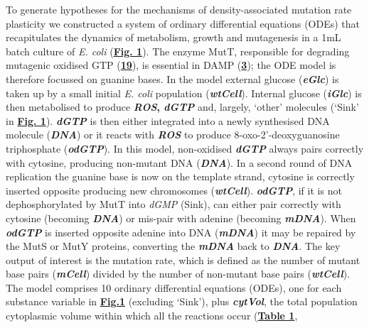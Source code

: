 \documentclass[
  12pt,
  letterpaper,
  DIV=11,
  numbers=noendperiod]{scrreprt}
\begin{document}
To generate hypotheses for the mechanisms of density-associated mutation
rate plasticity we constructed a system of ordinary differential
equations (ODEs) that recapitulates the dynamics of metabolism, growth
and mutagenesis in a 1mL batch culture of \emph{E. coli}
(\href{https://www.biorxiv.org/content/10.1101/2023.09.27.557722v1.full\#F1}{\textbf{Fig.
1}}). The enzyme MutT, responsible for degrading mutagenic oxidised GTP
(\href{https://www.biorxiv.org/content/10.1101/2023.09.27.557722v1.full\#ref-19}{\textbf{19}}),
is essential in DAMP
(\href{https://www.biorxiv.org/content/10.1101/2023.09.27.557722v1.full\#ref-3}{\textbf{3}});
the ODE model is therefore focussed on guanine bases. In the model
external glucose (\textbf{\emph{eGlc}}) is taken up by a small initial
\emph{E. coli} population (\textbf{\emph{wtCell}}). Internal glucose
(\textbf{\emph{iGlc}}) is then metabolised to produce
\textbf{\emph{ROS}, \emph{dGTP}} and, largely, `other' molecules (`Sink'
in
\href{https://www.biorxiv.org/content/10.1101/2023.09.27.557722v1.full\#F1}{\textbf{Fig.
1}}). \textbf{\emph{dGTP}} is then either integrated into a newly
synthesised DNA molecule (\textbf{\emph{DNA}}) or it reacts with
\textbf{\emph{ROS}} to produce 8-oxo-2'-deoxyguanosine triphosphate
(\textbf{\emph{odGTP}}). In this model, non-oxidised
\textbf{\emph{dGTP}} always pairs correctly with cytosine, producing
non-mutant DNA (\textbf{\emph{DNA}}). In a second round of DNA
replication the guanine base is now on the template strand, cytosine is
correctly inserted opposite producing new chromosomes
(\textbf{\emph{wtCell}}). \textbf{\emph{odGTP}}, if it is not
dephosphorylated by MutT into \emph{dGMP} (Sink), can either pair
correctly with cytosine (becoming \textbf{\emph{DNA}}) or mis-pair with
adenine (becoming \textbf{\emph{mDNA}}). When \textbf{\emph{odGTP}} is
inserted opposite adenine into DNA (\textbf{\emph{mDNA}}) it may be
repaired by the MutS or MutY proteins, converting the
\textbf{\emph{mDNA}} back to \textbf{\emph{DNA}}. The key output of
interest is the mutation rate, which is defined as the number of mutant
base pairs (\textbf{\emph{mCell}}) divided by the number of non-mutant
base pairs (\textbf{\emph{wtCell}}). The model comprises 10 ordinary
differential equations (ODEs), one for each substance variable in
\href{https://www.biorxiv.org/content/10.1101/2023.09.27.557722v1.full\#F1}{\textbf{Fig.1}}
(excluding `Sink'), plus \textbf{\emph{cytVol}}, the total population
cytoplasmic volume within which all the reactions occur
(\href{https://www.biorxiv.org/content/10.1101/2023.09.27.557722v1.full\#T1}{\textbf{Table
1}},
\end{document}
